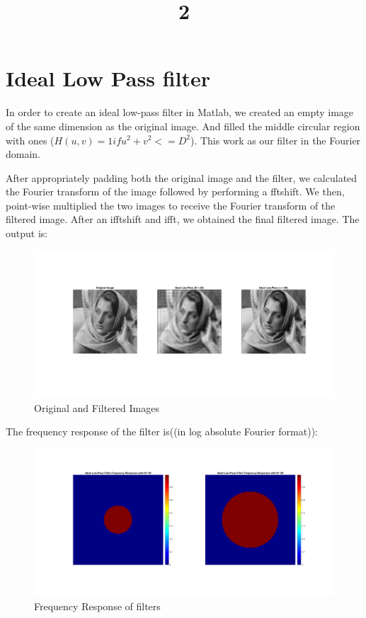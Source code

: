 \documentclass[a4paper]{article}
\title{2}
\date{}
\begin{document}
\maketitle

\section{Ideal Low Pass filter}
In order to create an ideal low-pass filter in Matlab, we created an empty image of the same dimension as the original image. And filled the middle circular region with ones ($H(u,v) = 1 if u^2 + v^2 <=D^2$). This work as our filter in the Fourier domain.

After appropriately padding both the original image and the filter, we calculated the Fourier transform of the image followed by performing a fftshift.
We then, point-wise multiplied the two images to receive the Fourier transform of the filtered image. After an ifftshift and ifft, we obtained the final filtered image. The output is:

\begin{figure}[h]
    \centering
    \includegraphics[width=\linewidth]{img1.png}
    \caption{Original and Filtered Images}
\end{figure}

The frequency response of the filter is((in log absolute Fourier format)):
\begin{figure}[h]
    \centering
    \includegraphics[width=.5\linewidth]{img3.png}
    \caption{Frequency Response of filters}
\end{figure}
\end{document}
